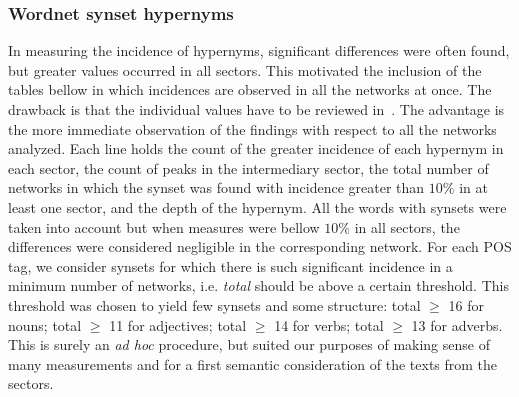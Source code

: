 \subsubsection{Wordnet synset hypernyms}\label{subsec:wn1}
In measuring the incidence of hypernyms, significant differences were often found, but greater values
occurred in all sectors.
This motivated the inclusion of the tables bellow in which incidences are observed in all the networks at once.
The drawback is that the individual values have to be reviewed in~\cite{textTables}.
The advantage is the more immediate observation of the findings with respect to all the networks analyzed.
Each line holds the count of the greater incidence of each hypernym in each sector,
the count of peaks in the intermediary sector, the total number of networks in which the
synset was found with incidence greater than $10\%$ in at least one sector,
and the depth of the hypernym.
All the words with synsets were taken into account but when measures were bellow $10\%$ in all
sectors, the differences were considered negligible in the corresponding network.
For each POS tag, we consider synsets for which there is such significant incidence in a minimum number of networks,
i.e. \emph{total} should be above a certain threshold.
This threshold was chosen to yield few synsets and some structure:
total $\geq$ 16 for nouns;
total $\geq$ 11 for adjectives;
total $\geq$ 14 for verbs;
total $\geq$ 13 for adverbs.
This is surely an \emph{ad hoc} procedure,
but suited our purposes of making sense of many measurements
and for a first semantic consideration of the texts from the sectors. 

